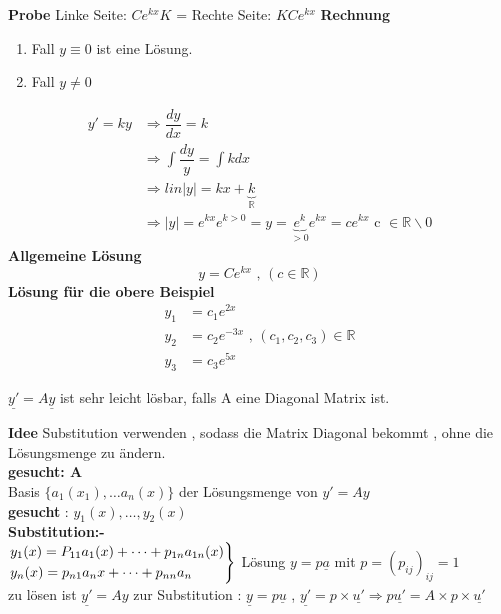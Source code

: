 \textbf{Probe}\newline
Linke Seite: $Ce^{kx}K$ = Rechte Seite: $K Ce^{kx}$\newline
\textbf{Rechnung}
\begin{enumerate}
\item Fall $y \equiv 0$ ist eine Lösung.
\item Fall $y \neq 0$
\end{enumerate}
\begin{align*}
y'=ky &\Rightarrow \dfrac{dy}{dx}=k\\
      &\Rightarrow \int\dfrac{dy}{y}= \int k dx\\
      &\Rightarrow lin|y| = kx + \underbrace{k}_{\mathbb{R}}\\
      &\Rightarrow |y|=e^{kx}e^{k > 0} = y = \underbrace{e^{k}}_{>0}e^{kx}=ce^{kx} \text{ c } \in \mathbb{R} \backslash 0
\end{align*}
\textbf{Allgemeine Lösung}\\
\[ y = Ce^{kx} \text{ , } (c \in \mathbb{R}) \]
\textbf{Lösung für die obere Beispiel }
\begin{align*}
y_1 &= c_1 e^{2x}\\
y_2 &= c_2 e^{-3x} \text{ , }(c_1 , c_2 , c_3) \in \mathbb{R} \\
y_3 &= c_3 e^{5x}
\end{align*}
\begin{remark}
$\underline{y'} = A \underline{y} $ ist sehr leicht lösbar, falls A eine Diagonal Matrix ist. 
\end{remark}
\textbf{Idee} Substitution verwenden , sodass die Matrix Diagonal bekommt , ohne die Lösungsmenge zu ändern.\\
 \textbf{gesucht: A}\\
Basis $ \{ a_1(x_1) , \dots a_n(x) \} $ der Lösungsmenge von $y'= Ay$\\
\textbf{gesucht} : $y_1(x) , \dots , y_2(x)$\\
\textbf{Substitution:-} \\
$\begin{rcases}
y_1(x) = P_{11} a_1(x) + \dots + p_{1n} a_{1n}(x) \\
	y_n(x)=p_{n1} a_n{x} + \dots + p_{nn}a_n\\	 
	\end{rcases}$ Lösung $ y = p \underline{a} $ mit $ p = (p_{ij})_{ij}=1 $\\
zu lösen ist $\underline{y'} = Ay $ zur Substitution : $\underline{y} = p \underline{u}$ , 
$\underline{y'}= p \times \underline{u'} \Rightarrow p \underline{u'} = A \times p \times \underline{u'}$\\
